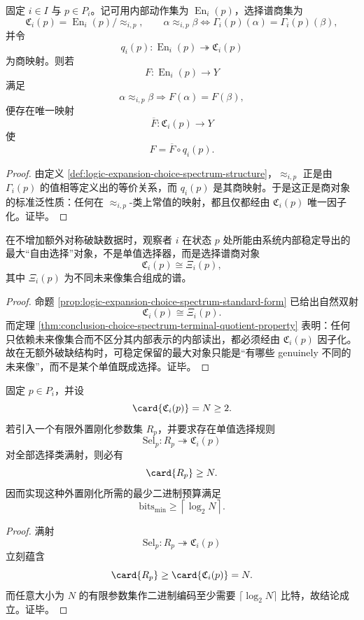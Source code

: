 \begin{theorem}[选择谱的终对象性质]\label{thm:conclusion-choice-spectrum-terminal-quotient-property}
固定 \(i\in I\) 与 \(p\in P_i\)。记可用内部动作集为 \(\operatorname{En}_i(p)\)，选择谱商集为
\[
\mathfrak C_i(p)=\operatorname{En}_i(p)/{\approx_{i,p}},
\qquad
\alpha\approx_{i,p}\beta
\iff
\Gamma_i(p)(\alpha)=\Gamma_i(p)(\beta),
\]
并令
\[
q_i(p):\operatorname{En}_i(p)\twoheadrightarrow \mathfrak C_i(p)
\]
为商映射。则若
\[
F:\operatorname{En}_i(p)\to Y
\]
满足
\[
\alpha\approx_{i,p}\beta \Longrightarrow F(\alpha)=F(\beta),
\]
便存在唯一映射
\[
\overline F:\mathfrak C_i(p)\to Y
\]
使
\[
F=\overline F\circ q_i(p).
\]
\end{theorem}
\begin{proof}
由定义 \ref{def:logic-expansion-choice-spectrum-structure}，\(\approx_{i,p}\) 正是由 \(\Gamma_i(p)\) 的值相等定义出的等价关系，而 \(q_i(p)\) 是其商映射。于是这正是商对象的标准泛性质：任何在 \(\approx_{i,p}\)-类上常值的映射，都且仅都经由 \(\mathfrak C_i(p)\) 唯一因子化。证毕。
\end{proof}

\begin{corollary}\label{cor:conclusion-choice-spectrum-not-selector-maximal-object}
在不增加额外对称破缺数据时，观察者 \(i\) 在状态 \(p\) 处所能由系统内部稳定导出的最大“自由选择”对象，不是单值选择器，而是选择谱商对象
\[
\mathfrak C_i(p)\cong \Xi_i(p),
\]
其中 \(\Xi_i(p)\) 为不同未来像集合组成的谱。
\end{corollary}
\begin{proof}
命题 \ref{prop:logic-expansion-choice-spectrum-standard-form} 已给出自然双射
\[
\mathfrak C_i(p)\cong \Xi_i(p).
\]
而定理 \ref{thm:conclusion-choice-spectrum-terminal-quotient-property} 表明：任何只依赖未来像集合而不区分其内部表示的内部读出，都必须经由 \(\mathfrak C_i(p)\) 因子化。故在无额外破缺结构时，可稳定保留的最大对象只能是“有哪些 genuinely 不同的未来像”，而不是某个单值既成选择。证毕。
\end{proof}

\begin{theorem}[选择刚化的最小外置信息下界]\label{thm:conclusion-choice-rigidification-minimal-external-bit-budget}
固定 \(p\in P_i\)，并设
\[
\card{\mathfrak C_i(p)}=N\ge 2.
\]
若引入一个有限外置刚化参数集 \(R_p\)，并要求存在单值选择规则
\[
\mathrm{Sel}_p:R_p\twoheadrightarrow \mathfrak C_i(p)
\]
对全部选择类满射，则必有
\[
\card{R_p}\ge N.
\]
因而实现这种外置刚化所需的最少二进制预算满足
\[
\text{bits}_{\min}\ge \left\lceil\log_2 N\right\rceil.
\]
\end{theorem}
\begin{proof}
满射
\[
\mathrm{Sel}_p:R_p\twoheadrightarrow \mathfrak C_i(p)
\]
立刻蕴含
\[
\card{R_p}\ge \card{\mathfrak C_i(p)}=N.
\]
而任意大小为 \(N\) 的有限参数集作二进制编码至少需要 \(\lceil\log_2 N\rceil\) 比特，故结论成立。证毕。
\end{proof}

